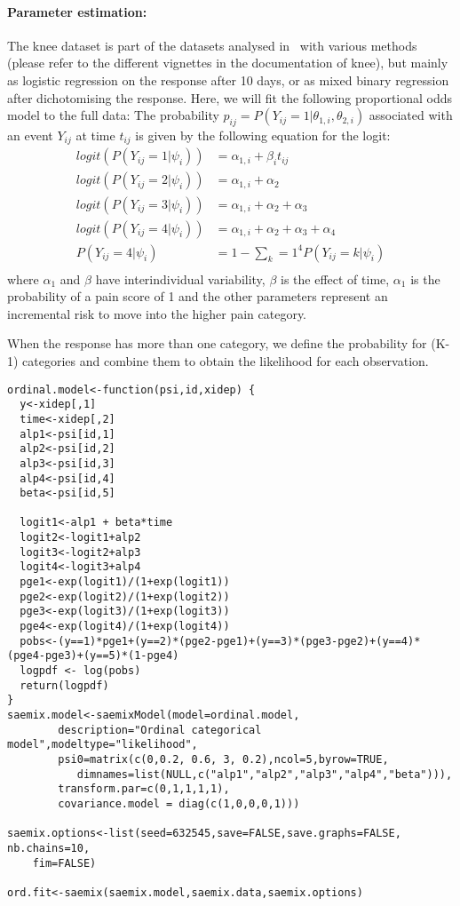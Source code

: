 \paragraph{Parameter estimation:} The {\sf knee} dataset is part of the datasets analysed in~\cite{Tutz12} with various methods (please refer to the different vignettes in the documentation of {\sf knee}), but mainly as logistic regression on the response after 10 days, or as mixed binary regression after dichotomising the response. Here, we will fit the following proportional odds model to the full data:
The probability $p_{ij}=P(Y_{ij}=1 | \theta_{1,i}, \theta_{2,i})$ associated with an event $Y_{ij}$ at time $t_{ij}$ is given by the following equation for the logit:
\begin{equation}
\begin{split}
logit(P(Y_{ij} = 1 | \psi_i)) &= \alpha_{1,i} + \beta_{i} t_{ij} \\
logit(P(Y_{ij} = 2 | \psi_i)) &= \alpha_{1,i} + \alpha_2 \\
logit(P(Y_{ij} = 3 | \psi_i)) &= \alpha_{1,i} + \alpha_2 + \alpha_3 \\
logit(P(Y_{ij} = 4 | \psi_i)) &= \alpha_{1,i} + \alpha_2 + \alpha_3 +\alpha_4\\
P(Y_{ij} = 4 | \psi_i) &= 1 - \sum_k=1^4 P(Y_{ij} = k | \psi_i)\\
\end{split}
\end{equation}
where $\alpha_1$ and $\beta$ have interindividual variability, $\beta$ is the effect of time, $\alpha_1$ is the probability of a pain score of 1 and the other parameters represent an incremental risk to move into the higher pain category.

When the response has more than one category, we define the probability for (K-1) categories and combine them to obtain the likelihood for each observation. 

\begin{verbatim}
ordinal.model<-function(psi,id,xidep) {
  y<-xidep[,1]
  time<-xidep[,2]
  alp1<-psi[id,1]
  alp2<-psi[id,2]
  alp3<-psi[id,3]
  alp4<-psi[id,4]
  beta<-psi[id,5]
  
  logit1<-alp1 + beta*time
  logit2<-logit1+alp2
  logit3<-logit2+alp3
  logit4<-logit3+alp4
  pge1<-exp(logit1)/(1+exp(logit1))
  pge2<-exp(logit2)/(1+exp(logit2))
  pge3<-exp(logit3)/(1+exp(logit3))
  pge4<-exp(logit4)/(1+exp(logit4))
  pobs<-(y==1)*pge1+(y==2)*(pge2-pge1)+(y==3)*(pge3-pge2)+(y==4)*(pge4-pge3)+(y==5)*(1-pge4)
  logpdf <- log(pobs)  
  return(logpdf)
}  
saemix.model<-saemixModel(model=ordinal.model,
        description="Ordinal categorical model",modeltype="likelihood",
        psi0=matrix(c(0,0.2, 0.6, 3, 0.2),ncol=5,byrow=TRUE,
           dimnames=list(NULL,c("alp1","alp2","alp3","alp4","beta"))),
        transform.par=c(0,1,1,1,1),
        covariance.model = diag(c(1,0,0,0,1)))

saemix.options<-list(seed=632545,save=FALSE,save.graphs=FALSE, nb.chains=10, 
    fim=FALSE)

ord.fit<-saemix(saemix.model,saemix.data,saemix.options)
\end{verbatim}

